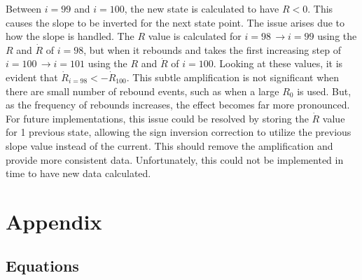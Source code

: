 \documentclass[12pt]{article}
\begin{document}
\noindent Between $i=99$ and $i=100$, the new state is calculated to have $R < 0$. This causes the slope to be inverted for the next state point. The issue arises due to how the slope is handled. The $R$ value is calculated for $i=98 \, \rightarrow i=99$ using the $R$ and $\dot R$ of $i=98$, but when it rebounds and takes the first increasing step of $i=100 \, \rightarrow i=101$ using the $R$ and $\dot R$ of $i=100$. Looking at these values, it is evident that $\dot R_{i=98} < -\dot R_{100}$. This subtle amplification is not significant when there are small number of rebound events, such as when a large $R_0$ is used. But, as the frequency of rebounds increases, the effect becomes far more pronounced. For future implementations, this issue could be resolved by storing the $\dot R$ value for 1 previous state, allowing the sign inversion correction to utilize the previous slope value instead of the current. This should remove the amplification and provide more consistent data. Unfortunately, this could not be implemented in time to have new data calculated.

\clearpage

\clearpage
\section{Appendix} \label{appendix}

\subsection{Equations} \label{appendix_equations}
\end{document}
